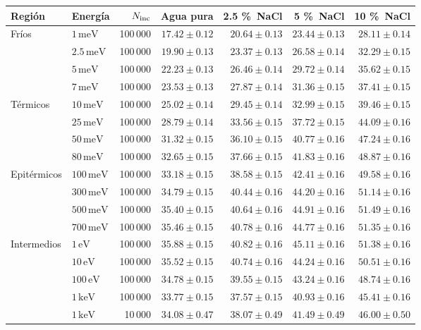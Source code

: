 \begin{tabular}{llrrrrr}
\toprule
Región & Energía & $N_{\rm inc}$ & Agua pura & 2.5 \%~NaCl & 5 \%~NaCl & 10 \%~NaCl \\
\midrule
Fríos & $1\,\mathrm{meV}$ & 100\,000 & $17.42\pm0.12$ & $20.64\pm0.13$ & $23.44\pm0.13$ & $28.11\pm0.14$ \\
 & $2.5\,\mathrm{meV}$ & 100\,000 & $19.90\pm0.13$ & $23.37\pm0.13$ & $26.58\pm0.14$ & $32.29\pm0.15$ \\
 & $5\,\mathrm{meV}$ & 100\,000 & $22.23\pm0.13$ & $26.46\pm0.14$ & $29.72\pm0.14$ & $35.62\pm0.15$ \\
 & $7\,\mathrm{meV}$ & 100\,000 & $23.53\pm0.13$ & $27.87\pm0.14$ & $31.36\pm0.15$ & $37.41\pm0.15$ \\
\midrule
Térmicos & $10\,\mathrm{meV}$ & 100\,000 & $25.02\pm0.14$ & $29.45\pm0.14$ & $32.99\pm0.15$ & $39.46\pm0.15$ \\
 & $25\,\mathrm{meV}$ & 100\,000 & $28.79\pm0.14$ & $33.56\pm0.15$ & $37.72\pm0.15$ & $44.09\pm0.16$ \\
 & $50\,\mathrm{meV}$ & 100\,000 & $31.32\pm0.15$ & $36.10\pm0.15$ & $40.77\pm0.16$ & $47.24\pm0.16$ \\
 & $80\,\mathrm{meV}$ & 100\,000 & $32.65\pm0.15$ & $37.66\pm0.15$ & $41.83\pm0.16$ & $48.87\pm0.16$ \\
\midrule
Epitérmicos & $100\,\mathrm{meV}$ & 100\,000 & $33.18\pm0.15$ & $38.58\pm0.15$ & $42.41\pm0.16$ & $49.58\pm0.16$ \\
 & $300\,\mathrm{meV}$ & 100\,000 & $34.79\pm0.15$ & $40.44\pm0.16$ & $44.20\pm0.16$ & $51.14\pm0.16$ \\
 & $500\,\mathrm{meV}$ & 100\,000 & $35.40\pm0.15$ & $40.64\pm0.16$ & $44.91\pm0.16$ & $51.49\pm0.16$ \\
 & $700\,\mathrm{meV}$ & 100\,000 & $35.46\pm0.15$ & $40.78\pm0.16$ & $44.77\pm0.16$ & $51.35\pm0.16$ \\
\midrule
Intermedios & $1\,\mathrm{eV}$ & 100\,000 & $35.88\pm0.15$ & $40.82\pm0.16$ & $45.11\pm0.16$ & $51.38\pm0.16$ \\
 & $10\,\mathrm{eV}$ & 100\,000 & $35.52\pm0.15$ & $40.74\pm0.16$ & $44.24\pm0.16$ & $50.51\pm0.16$ \\
 & $100\,\mathrm{eV}$ & 100\,000 & $34.78\pm0.15$ & $39.55\pm0.15$ & $43.24\pm0.16$ & $48.74\pm0.16$ \\
 & $1\,\mathrm{keV}$ & 100\,000 & $33.77\pm0.15$ & $37.57\pm0.15$ & $40.93\pm0.16$ & $45.41\pm0.16$ \\
\midrule
 & $1\,\mathrm{keV}$ & 10\,000 & $34.08\pm0.47$ & $38.07\pm0.49$ & $41.49\pm0.49$ & $46.00\pm0.50$ \\

\end{tabular}
